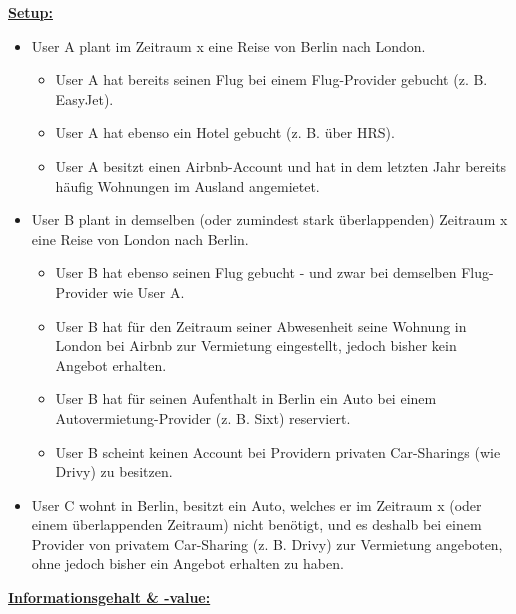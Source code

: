 \vspace{0.3cm}

\begin{Example} 

\vspace{0.2cm}

\underline{\textbf{Setup:}}

\begin{itemize}
  \item User A plant im Zeitraum x eine Reise von Berlin nach London.
  \begin{itemize}
  	\item User A hat bereits seinen Flug bei einem Flug-Provider gebucht (z. B. EasyJet).
  	\item User A hat ebenso ein Hotel gebucht (z. B. über HRS).
  	\item User A besitzt einen Airbnb-Account und hat in dem letzten Jahr bereits häufig Wohnungen im Ausland angemietet.
  \end{itemize}
  \item User B plant in demselben (oder zumindest stark überlappenden) Zeitraum x eine Reise von London nach Berlin.
  \begin{itemize}
  	\item User B hat ebenso seinen Flug gebucht - und zwar bei demselben Flug-Provider  wie User A.
  	\item User B hat für den Zeitraum seiner Abwesenheit seine Wohnung in London bei Airbnb zur Vermietung eingestellt, jedoch bisher kein Angebot erhalten.
  	\item User B hat für seinen Aufenthalt in Berlin ein Auto bei einem 
  	\newline Autovermietung-Provider (z. B. Sixt) reserviert.
  	\item User B scheint keinen Account bei Providern privaten Car-Sharings (wie Drivy) zu besitzen.
  \end{itemize}
  \item User C wohnt in Berlin, besitzt ein Auto, welches er im Zeitraum x (oder einem überlappenden Zeitraum) nicht benötigt, und es deshalb bei einem Provider von privatem Car-Sharing (z. B. Drivy) zur Vermietung angeboten, ohne jedoch bisher ein Angebot erhalten zu haben.
\end{itemize}

\vspace{0.3cm}

\underline{\textbf{Informationsgehalt \& -value:}}


\end{Example}

